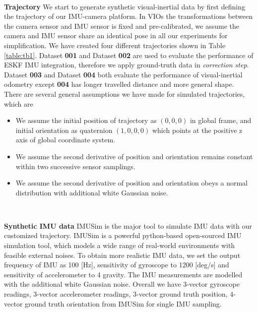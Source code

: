 \

\textbf{Trajectory} We start to generate synthetic visual-inertial data by first defining the trajectory of our IMU-camera platform. In VIOs the transformations between the camera sensor and IMU sensor is fixed and pre-calibrated, we assume the camera and IMU sensor share an identical pose in all our experiments for simplification. We have created four different trajectories shown in Table \ref{table:tb1}. Dataset \textbf{001} and Dataset \textbf{002} are used to evaluate the performance of ESKF IMU integration, therefore we apply ground-truth data in \textit{correction step}. Dataset \textbf{003} and Dataset \textbf{004} both evaluate the performance of visual-inertial odometry except \textbf{004} has longer travelled distance and more general shape. There are several general assumptions we have made for simulated trajectories, which are
\begin{itemize}
\item{We assume the initial position of trajectory as $(0, 0, 0)$ in global frame, and initial orientation as quaternion $(1, 0, 0, 0)$ which points at the positive z axis of global coordinate system.}
\item{We assume the second derivative of position and orientation remains constant within two successive sensor samplings.}
\item{We assume the second derivative of position and orientation obeys a normal distribution with additional white Gaussian noise.}
\end{itemize}

\

\textbf{Synthetic IMU data} IMUSim \cite{young2011imusim} is the major tool to simulate IMU data with our customized trajectory. IMUSim is a powerful python-based open-sourced IMU simulation tool, which models a wide range of real-world environments with feasible external noises. To obtain more realistic IMU data, we set the output frequency of IMU as 100 [Hz], sensitivity of gyroscope to 1200 [deg/s] and sensitivity of accelerometer to 4 gravity. The IMU measurements are modelled with the additional white Gaussian noise. Overall we have 3-vector gyroscope readings, 3-vector accelerometer readings, 3-vector ground truth position, 4-vector ground truth orientation from IMUSim for single IMU sampling.

\

